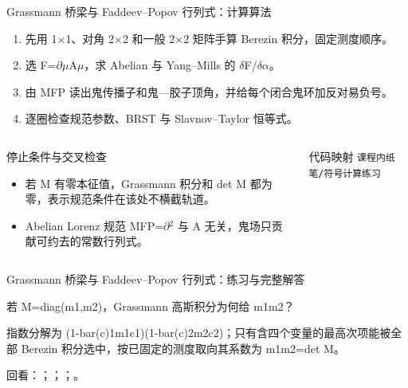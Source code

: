 \begin{frame}[t]{Grassmann 桥梁与 Faddeev--Popov 行列式：计算算法}
\footnotesize
{}\begin{enumerate}
\item 先用 1\ensuremath{\times}1、对角 2\ensuremath{\times}2 和一般 2\ensuremath{\times}2 矩阵手算 Berezin 积分，固定测度顺序。
\item 选 F=\ensuremath{\partial}\ensuremath{\mu}A\ensuremath{\mu}，求 Abelian 与 Yang--Mills 的 \ensuremath{\delta}F/\allowbreak{}\ensuremath{\delta}\ensuremath{\alpha}。
\item 由 MFP 读出鬼传播子和鬼—胶子顶角，并给每个闭合鬼环加反对易负号。
\item 逐圈检查规范参数、BRST 与 Slavnov--Taylor 恒等式。
\end{enumerate}\begin{columns}[T,onlytextwidth]
\begin{block}{停止条件与交叉检查}\scriptsize\begin{itemize}
\item[\CheckMark] 若 M 有零本征值，Grassmann 积分和 det M 都为零，表示规范条件在该处不横截轨道。
\item[\CheckMark] Abelian Lorenz 规范 MFP=\ensuremath{\partial}\ensuremath{^{2}} 与 A 无关，鬼场只贡献可约去的常数行列式。
\end{itemize}\end{block}
\begin{block}{代码映射}
\scriptsize \texttt{课程内纸笔/\allowbreak{}符号计算练习}
\end{block}\end{columns}\end{frame}

\begin{frame}[t]{Grassmann 桥梁与 Faddeev--Popov 行列式：练习与完整解答}
\footnotesize
\begin{block}{}若 M=diag(m1,m2)，Grassmann 高斯积分为何给 m1m2？\end{block}
\begin{exampleblock}{}指数分解为 (1-bar(c)1m1c1)(1-bar(c)2m2c2)；只有含四个变量的最高次项能被全部 Berezin 积分选中，按已固定的测度取向其系数为 m1m2=det M。\end{exampleblock}
\vfill
\scriptsize 回看：；；；。
\end{frame}

